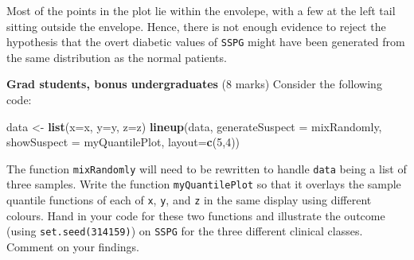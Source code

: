 \documentclass[9pt,letter]{article}
\newenvironment{Shaded}{\begin{snugshade}}{\end{snugshade}}
\newcommand{\KeywordTok}[1]{\textcolor[rgb]{0.13,0.29,0.53}{\textbf{#1}}}
\newcommand{\DataTypeTok}[1]{\textcolor[rgb]{0.13,0.29,0.53}{#1}}
\newcommand{\DecValTok}[1]{\textcolor[rgb]{0.00,0.00,0.81}{#1}}
\newcommand{\StringTok}[1]{\textcolor[rgb]{0.31,0.60,0.02}{#1}}
\newcommand{\NormalTok}[1]{#1}
\begin{document}
Most of the points in the plot lie within the envolepe, with a few at
the left tail sitting outside the envelope. Hence, there is not enough
evidence to reject the hypothesis that the overt diabetic values of
\texttt{SSPG} might have been generated from the same distribution as
the normal patients.

\item 

\textbf{Grad students, bonus undergraduates} (8 marks) Consider the
following code:

\begin{Shaded}
\begin{Highlighting}[]
\NormalTok{data <-}\StringTok{ }\KeywordTok{list}\NormalTok{(}\DataTypeTok{x=}\NormalTok{x, }\DataTypeTok{y=}\NormalTok{y, }\DataTypeTok{z=}\NormalTok{z)}
\KeywordTok{lineup}\NormalTok{(data, }
\DataTypeTok{generateSuspect =}\NormalTok{ mixRandomly, }
\DataTypeTok{showSuspect =}\NormalTok{ myQuantilePlot, }
\DataTypeTok{layout=}\KeywordTok{c}\NormalTok{(}\DecValTok{5}\NormalTok{,}\DecValTok{4}\NormalTok{))}
\end{Highlighting}
\end{Shaded}

The function \texttt{mixRandomly} will need to be rewritten to handle
\texttt{data} being a list of three samples. Write the function
\texttt{myQuantilePlot} so that it overlays the sample quantile
functions of each of \texttt{x}, \texttt{y}, and \texttt{z} in the same
display using different colours. Hand in your code for these two
functions and illustrate the outcome (using \texttt{set.seed(314159)})
on \texttt{SSPG} for the three different clinical classes. Comment on
your findings.
\end{document}
